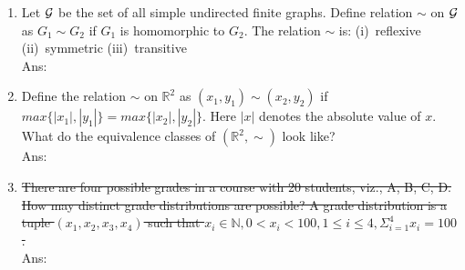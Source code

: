 \documentclass[10pt, letterpaper]{article}
\newcommand{\eat}[1]{}
\begin{document}
\begin{enumerate}
\begin{enumerate*}
\item  5 \eat{*}

\end{enumerate*}


\item Let $\cal{G}$ be the set of all simple undirected finite graphs. Define relation $\sim$ on $\cal{G}$ as $G_1 \sim G_2$ if $G_1$ is homomorphic to $G_2$. The relation $\sim$ is: (i)~reflexive (ii)~symmetric (iii)~transitive\\
Ans:



\item Define the relation $\sim$ on $\mathbb{R}^2$ as $(x_1, y_1) \sim (x_2, y_2)$ if $max\{|x_1|, |y_1|\} = max\{|x_2|,  |y_2|\}$. Here $|x|$ denotes the absolute value of $x$. What do the equivalence classes of $(\mathbb{R}^2, \sim)$ look like?\\
Ans:



\item \sout{There are four possible grades in a course with 20 students, viz., A, B, C, D. How may distinct grade distributions are possible? A grade distribution is a tuple $(x_1, x_2, x_3, x_4)$ such that $x_i \in \mathbb{N}, 0 < x_i < 100 , 1 \leq i \leq 4, \Sigma_{i=1}^4 x_i = 100$.} \\
Ans:


\end{enumerate}
\end{document}
